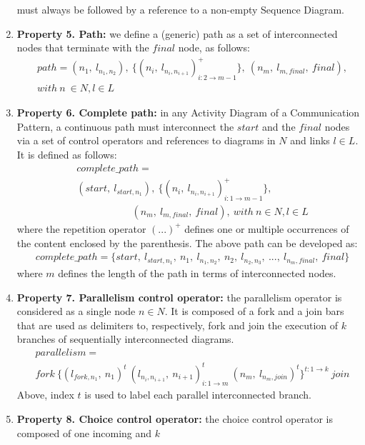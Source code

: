 \documentclass{llncs}
\begin{document}
\begin{subappendices}
\begin{enumerate}
	must always be followed by a reference to a non-empty Sequence Diagram.
	\item \textbf{Property 5. Path:} we define a (generic) path as a set of interconnected nodes that terminate with the
	$final$ node, as follows:
		\begin{align*}
		&path = (n_1,\ l_{n_1,n_2}),\ \{(n_i,\ l_{n_i,n_{i+1}})^{+}_{i:2 \rightarrow m-1}\},\ (n_m,\ l_{m,final},\ final),\\
		&with\ n\ \in N, l \in L
		\end{align*}
	\item \textbf{Property 6. Complete path:} in any Activity Diagram of a Communication Pattern, a continuous path
	must interconnect the $start$ and the $final$ nodes via a set of control operators and references to diagrams in $N$
	and links $l \in L$. It is defined as follows:
		\begin{align*}
		&complete\_path =\\
		&(start,\ l_{start,n_1}),\ \{(n_i,\ l_{n_i,n_{i+1}})^{+}_{i:1 \rightarrow m-1}\},\\
		&\ \ \ \ \ \ \ \ \ \ \ \ \ \ \ \ \ \ \ \ \ \ \ \ \ (n_m,\ l_{m,final},\ final),\ with\ n \in N, l \in L
		\end{align*}
	where the repetition operator $(...)^{+}$ defines one or multiple occurrences of the content enclosed by the
	parenthesis. The above path can be developed as:
		\begin{align*}
		&complete\_path = \{start,\ l_{start,n_1},\ n_1,\ l_{n_1,n_2},\ n_2,\ l_{n_2,n_3},\ ...,\ l_{n_m,final},\ final\}
		\end{align*}
	where $m$ defines the length of the path in terms of interconnected nodes.
	\item \textbf{Property 7. Parallelism control operator:} the parallelism operator is considered as a single node $n
	\in N$. It is composed of a fork and a join bars that are used as delimiters to, respectively, fork and join the
	execution of $k$ branches of sequentially interconnected diagrams.
		\begin{align*}
		&parallelism =\\
		&fork\ \{(l_{fork,n_1},\ n_1)^t\ (l_{n_i,n_{i+1}},\ n_{i+1})^t_{i:1 \rightarrow m}\
		(n_{m},\ l_{n_m,join})^t\}^{t:1 \rightarrow k}\ join
		\end{align*}
	Above, index $t$ is used to label each parallel interconnected branch.
	\item \textbf{Property 8. Choice control operator:} the choice control operator is composed of one incoming and $k$

\end{enumerate}
\end{subappendices}
\end{document}
